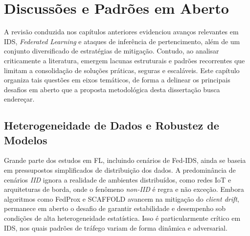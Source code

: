 \documentclass[
	12pt,				%
	openright,			%
	oneside,			%
	a4paper,			%
	english,			%
	french,				%
	spanish,			%
	brazil,				%
	]{abntex2}
\begin{document}




\section{Discussões e Padrões em Aberto}
\label{sec:discussoes_aberto}

A revisão conduzida nos capítulos anteriores evidenciou avanços relevantes em IDS, \textit{Federated Learning} e ataques de inferência de pertencimento, além de um conjunto diversificado de estratégias de mitigação. Contudo, ao analisar criticamente a literatura, emergem lacunas estruturais e padrões recorrentes que limitam a consolidação de soluções práticas, seguras e escaláveis. Este capítulo organiza tais questões em eixos temáticos, de forma a delinear os principais desafios em aberto que a proposta metodológica desta dissertação busca endereçar.

\subsection{Heterogeneidade de Dados e Robustez de Modelos}
Grande parte dos estudos em FL, incluindo cenários de Fed-IDS, ainda se baseia em pressupostos simplificados de distribuição dos dados. A predominância de cenários \textit{IID} ignora a realidade de ambientes distribuídos, como redes IoT e arquiteturas de borda, onde o fenômeno \textit{non-IID} é regra e não exceção. Embora algoritmos como FedProx \cite{li2020fedprox} e SCAFFOLD \cite{karimireddy2020scaffold} avancem na mitigação do \textit{client drift}, permanece em aberto o desafio de garantir estabilidade e desempenho sob condições de alta heterogeneidade estatística. Isso é particularmente crítico em IDS, nos quais padrões de tráfego variam de forma dinâmica e adversarial.
\end{document}
